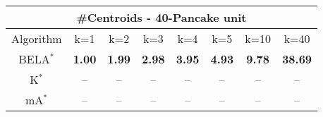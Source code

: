 \begin{tabular}{c|ccccccc}\toprule
\multicolumn{8}{c}{#Centroids - 40-Pancake unit}\\ \midrule
Algorithm & k=1 & k=2 & k=3 & k=4 & k=5 & k=10 & k=40 \\ \midrule
BELA$^*$ & \textbf{1.00} & \textbf{1.99} & \textbf{2.98} & \textbf{3.95} & \textbf{4.93} & \textbf{9.78} & \textbf{38.69} \\
K$^*$ & -- & -- & -- & -- & -- & -- & -- \\
mA$^*$ & -- & -- & -- & -- & -- & -- & -- \\ \bottomrule 
\end{tabular}

